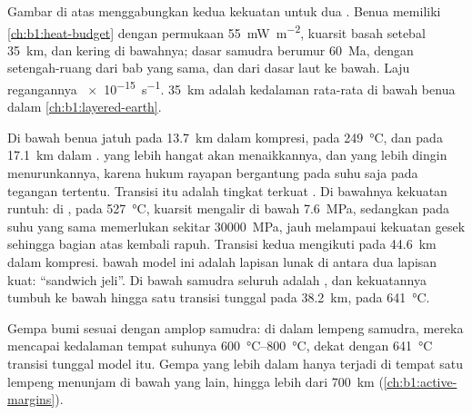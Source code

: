 Gambar di atas menggabungkan kedua kekuatan untuk dua . Benua memiliki  \cref{ch:b1:heat-budget} dengan  permukaan \qty{55}{mW.m^{-2}},  kuarsit basah setebal \qty{35}{km}, dan  kering di bawahnya; dasar samudra berumur \qty{60}{Ma}, dengan  setengah-ruang dari bab yang sama, dan  dari dasar laut ke bawah. Laju regangannya \qty{e-15}{s^{-1}}. \qty{35}{km} adalah kedalaman rata-rata  di bawah benua dalam  \cref{ch:b1:layered-earth}.

Di bawah benua  jatuh pada \qty{13.7}{km} dalam kompresi, pada \qty{249}{\degreeCelsius}, dan pada \qty{17.1}{km} dalam .  yang lebih hangat akan menaikkannya, dan yang lebih dingin menurunkannya, karena hukum rayapan bergantung pada suhu saja pada tegangan tertentu. Transisi itu adalah tingkat terkuat .
Di bawahnya kekuatan runtuh: di , pada \qty{527}{\degreeCelsius}, kuarsit mengalir di bawah \qty{7.6}{MPa}, sedangkan  pada suhu yang sama memerlukan sekitar \qty{30000}{MPa}, jauh melampaui kekuatan gesek sehingga bagian atas  kembali rapuh. Transisi kedua mengikuti pada \qty{44.6}{km} dalam kompresi.  bawah model ini adalah lapisan lunak di antara dua lapisan kuat: ``sandwich jeli''. Di bawah samudra seluruh  adalah , dan kekuatannya tumbuh ke bawah hingga satu transisi tunggal pada \qty{38.2}{km}, pada \qty{641}{\degreeCelsius}.

Gempa bumi sesuai dengan amplop samudra: di dalam lempeng samudra, mereka mencapai kedalaman tempat suhunya \qtyrange{600}{800}{\degreeCelsius}, dekat dengan \qty{641}{\degreeCelsius} transisi tunggal model itu. Gempa yang lebih dalam hanya terjadi di tempat satu lempeng menunjam di bawah yang lain, hingga lebih dari \qty{700}{km} (\cref{ch:b1:active-margins}).

